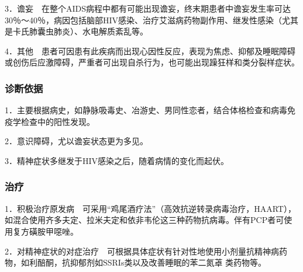 3．谵妄　在整个AIDS病程中都有可能出现谵妄，终末期患者中谵妄发生率可达30％～40％，病因包括脑部HIV感染、治疗艾滋病药物副作用、继发性感染（尤其是卡氏肺囊虫肺炎）、水电解质紊乱等。

4．其他　患者可因患有此疾病而出现心因性反应，表现为焦虑、抑郁及睡眠障碍或创伤后应激障碍，严重者可出现自杀行为，也可能出现躁狂样和类分裂样症状。

\subsubsection{诊断依据}

1．主要根据病史，如静脉吸毒史、冶游史、男同性恋者，结合体格检查和病毒免疫学检查中的阳性发现。

2．意识障碍，尤以谵妄状态更为多见。

3．精神症状多继发于HIV感染之后，随着病情的变化而起伏。

\subsubsection{治疗}

1．积极治疗原发病　可采用“鸡尾酒疗法”（高效抗逆转录病毒治疗，HAART），如混合使用齐多夫定、拉米夫定和依非韦伦这三种药物抗病毒。伴有PCP者可使用复方磺胺甲噁唑。

2．对精神症状的对症治疗　可根据具体症状有针对性地使用小剂量抗精神病药物，如利醅酮，抗抑郁剂如SSRIs类以及改善睡眠的苯二氮䓬
类药物等。


